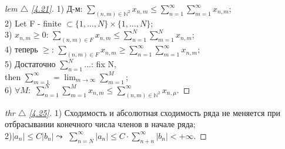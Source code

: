 \begin{minipage}[]{0.45\textwidth}
\begin{proof}[
 lem $\triangle$
\eqref{4.21}]

\phantom{42}
\noindent

1) Д-м: $\sum\nolimits_{ (n,m)\in \mathbb{N}^2 } x_{n,m} \leq \sum\nolimits_{ n=1 }^{ \infty } \sum\nolimits_{ m = 1 }^{ \infty } x_{n,m} $;\\
2) Let F - finite $\subset \{1, \dots, N \} \times\{1, \dots, N \}$;\\
3) $x_{n,m}\geq 0$: $\sum\limits_{ (n,m)\in F }^{  } x_{n,m}  \leq \sum\limits_{ n = 1 }^{ N } \sum\limits_{ m=1 }^{ N } x_{n,m}$;\\
4) теперь $\geq$: $\sum\limits_{ (n,m)\in F }^{  } x_{n,m}  \geq \sum\limits_{ n = 1 }^{ \infty } \sum\limits_{ m=1 }^{ \infty } x_{n,m}$;\\
5) Достаточно $\sum\nolimits_{ n = 1 }^{ N }\dots $: fix N, \\then $\sum\nolimits_{ m = 1 }^{ \infty } = \lim_{m\to \infty} \sum\nolimits_{ m=1 }^{ M } $;\\
6) $\forall M:$ $\sum\nolimits_{ n=1 }^{ N } \sum\nolimits_{ m=1 }^{ M } x_{n,m} \leq \sum\nolimits_{ (n,m)\in \mathbb{N}^2 }^{ \infty } x_{n,\mu} .$

\end{proof}

\begin{proof}[
thr $\triangle$
\eqref{4.25}]

\phantom{42}
\noindent

1) Сходимость и абсолютная сходимость ряда не меняется при отбрасывании конечного числа членов в начале ряда;\\
2)$|a_n| \leq C |b_n| \leadsto$ $\sum\limits_{ n=N }^{ \infty } |a_n| \leq C \cdot \sum\limits_{ n+n }^{ \infty } |b_n| < +\infty$.

\end{proof}
\end{minipage}
